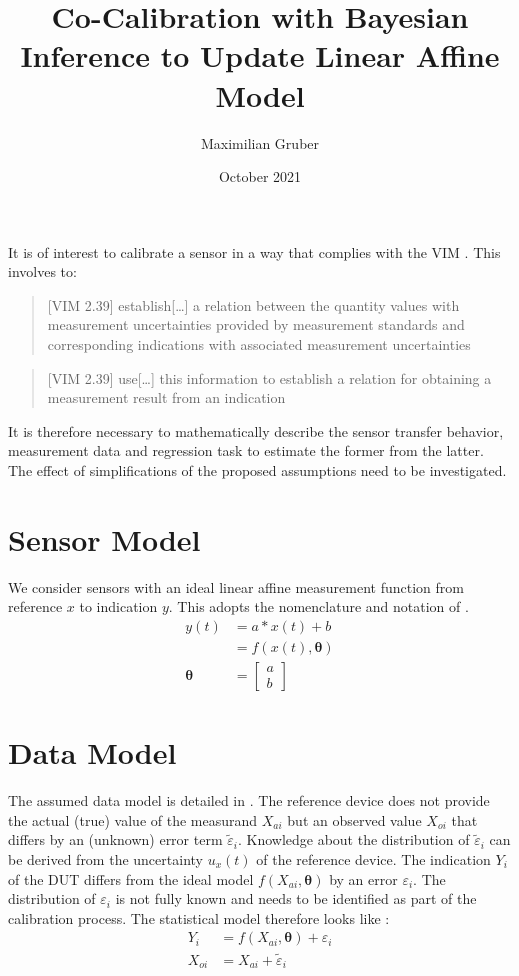 \documentclass[10pt]{article}
\title{Co-Calibration with Bayesian Inference to Update Linear Affine Model}
\author{Maximilian Gruber}    %
\date{October 2021}
\renewcommand{\vec}[1]{\boldsymbol{#1}}
\begin{document}
\maketitle

It is of interest to calibrate a sensor in a way that complies with the VIM \cite{bipm_2012}. 
This involves to:

\begin{quote}[VIM 2.39]
    establish[\dots] a relation between the quantity values with measurement uncertainties provided by measurement standards and corresponding indications with associated measurement uncertainties
\end{quote}

\begin{quote}[VIM 2.39]
    use[\dots] this information to establish a relation for obtaining a measurement result from an indication
\end{quote}

It is therefore necessary to mathematically describe the sensor transfer behavior, measurement data and regression task to estimate the former from the latter.
The effect of simplifications of the proposed assumptions need to be investigated.


\section{Sensor Model}
We consider sensors with an ideal linear affine measurement function from reference $x$ to indication $y$.
This adopts the nomenclature and notation of \cite{bipm_2008,bipm_2012}.
\begin{align}
    y(t) &= a*x(t) + b \nonumber \\
       &= f(x(t), \vec{\theta}) \\
    \vec{\theta} &= \begin{bmatrix} a \\ b \end{bmatrix}
\end{align}


\section{Data Model}
The assumed data model is detailed in \cite{dellaportas_1995}.
The reference device does not provide the actual (true) value of the measurand $X_{ai}$ but an observed value $X_{oi}$ that differs by an (unknown) error term $\tilde{\varepsilon}_i$.
Knowledge about the distribution of $\tilde{\varepsilon}_i$ can be derived from the uncertainty $u_x(t)$ of the reference device.
The indication $Y_i$ of the DUT differs from the ideal model $f(X_{ai}, \vec{\theta})$ by an error $\varepsilon_i$.
The distribution of $\varepsilon_i$ is not fully known and needs to be identified as part of the calibration process.
The statistical model therefore looks like \cite{dellaportas_1995}:
\begin{align}
    Y_i &= f(X_{ai}, \vec{\theta}) + \varepsilon_i \\
    X_{oi} &= X_{ai} + \tilde{\varepsilon}_i
\end{align}
\end{document}
